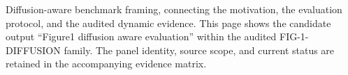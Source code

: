 Diffusion-aware benchmark framing, connecting the motivation, the evaluation protocol, and the audited dynamic evidence. This page shows the candidate output ``Figure1 diffusion aware evaluation'' within the audited FIG-1-DIFFUSION family. The panel identity, source scope, and current status are retained in the accompanying evidence matrix.
